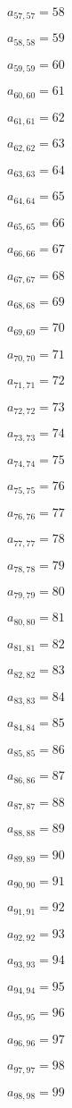 \documentclass[a4paper,12pt]{article}
\begin{document}
$a _{ 57, 57 } = 58$

$a _{ 58, 58 } = 59$

$a _{ 59, 59 } = 60$

$a _{ 60, 60 } = 61$

$a _{ 61, 61 } = 62$

$a _{ 62, 62 } = 63$

$a _{ 63, 63 } = 64$

$a _{ 64, 64 } = 65$

$a _{ 65, 65 } = 66$

$a _{ 66, 66 } = 67$

$a _{ 67, 67 } = 68$

$a _{ 68, 68 } = 69$

$a _{ 69, 69 } = 70$

$a _{ 70, 70 } = 71$

$a _{ 71, 71 } = 72$

$a _{ 72, 72 } = 73$

$a _{ 73, 73 } = 74$

$a _{ 74, 74 } = 75$

$a _{ 75, 75 } = 76$

$a _{ 76, 76 } = 77$

$a _{ 77, 77 } = 78$

$a _{ 78, 78 } = 79$

$a _{ 79, 79 } = 80$

$a _{ 80, 80 } = 81$

$a _{ 81, 81 } = 82$

$a _{ 82, 82 } = 83$

$a _{ 83, 83 } = 84$

$a _{ 84, 84 } = 85$

$a _{ 85, 85 } = 86$

$a _{ 86, 86 } = 87$

$a _{ 87, 87 } = 88$

$a _{ 88, 88 } = 89$

$a _{ 89, 89 } = 90$

$a _{ 90, 90 } = 91$

$a _{ 91, 91 } = 92$

$a _{ 92, 92 } = 93$

$a _{ 93, 93 } = 94$

$a _{ 94, 94 } = 95$

$a _{ 95, 95 } = 96$

$a _{ 96, 96 } = 97$

$a _{ 97, 97 } = 98$

$a _{ 98, 98 } = 99$
\end{document}
